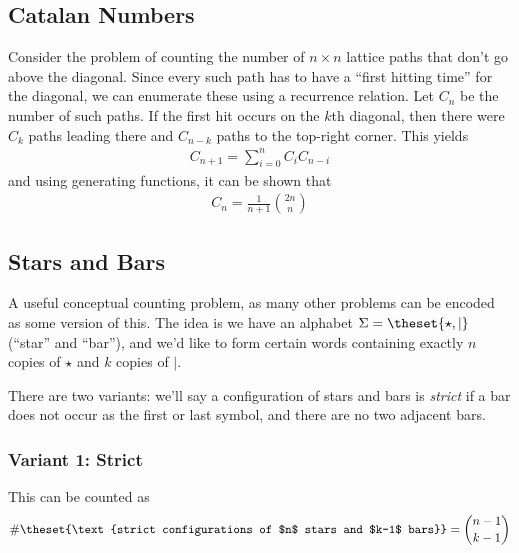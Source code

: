 \hypertarget{catalan-numbers}{%
\subsection{Catalan Numbers}\label{catalan-numbers}}

Consider the problem of counting the number of \(n\times n\) lattice
paths that don't go above the diagonal. Since every such path has to
have a ``first hitting time'' for the diagonal, we can enumerate these
using a recurrence relation. Let \(C_n\) be the number of such paths. If
the first hit occurs on the \(k\)th diagonal, then there were \(C_k\)
paths leading there and \(C_{n-k}\) paths to the top-right corner. This
yields
\begin{align*}
C_{n+1} = \sum_{i=0}^n C_i C_{n-i}
\end{align*} and using generating functions, it can be shown that
\begin{align*}
C_n = \frac{1}{n+1}{2n \choose n}
\end{align*}

\hypertarget{stars-and-bars}{%
\subsection{Stars and Bars}\label{stars-and-bars}}

A useful conceptual counting problem, as many other problems can be
encoded as some version of this. The idea is we have an alphabet
\(\Sigma = \theset{\star, \mid}\) (``star'' and ``bar''), and we'd like
to form certain words containing exactly \(n\) copies of \(\star\) and
\(k\) copies of \(\mid\).

There are two variants: we'll say a configuration of stars and bars is
\emph{strict} if a bar does not occur as the first or last symbol, and
there are no two adjacent bars.

\hypertarget{variant-1-strict}{%
\subsubsection{Variant 1: Strict}\label{variant-1-strict}}

\begin{proposition}[?]

This can be counted as
\begin{align*}
\#\theset{\text{strict configurations of $n$ stars and $k-1$ bars}} = {n-1 \choose k-1}
\end{align*}

\end{proposition}

